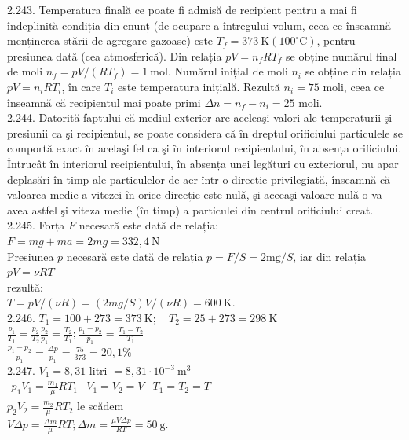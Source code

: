 2.243. Temperatura finală ce poate fi admisă de recipient pentru a mai fi îndeplinită condiția din enunț (de ocupare a întregului volum, ceea ce înseamnă menținerea stării de agregare gazoase) este $T_{f}=373 \mathrm{~K}\left(100^{\circ} \mathrm{C}\right)$, pentru presiunea dată (cea atmosferică). Din relația $p V=n_{f} R T_{f}$ se obține numărul final de moli $n_{f}=p V /\left(R T_{f}\right)=1 \mathrm{~mol}$. Numărul inițial de moli $n_{i}$ se obține din relația $p V=n_{i} R T_{i}$, în care $T_{i}$ este temperatura inițială. Rezultă $n_{i}=75$ moli, ceea ce înseamnă că recipientul mai poate primi $\Delta n=n_{f}-n_{i}=25$ moli.\\

2.244. Datorită faptului că mediul exterior are aceleaşi valori ale temperaturii şi presiunii ca şi recipientul, se poate considera că în dreptul orificiului particulele se comportă exact în acelaşi fel ca şi în interiorul recipientului, în absența orificiului. Întrucât în interiorul recipientului, în absența unei legături cu exteriorul, nu apar deplasări în timp ale particulelor de aer într-o direcție privilegiată, înseamnă că valoarea medie a vitezei în orice direcție este nulă, şi aceeaşi valoare nulă o va avea astfel şi viteza medie (în timp) a particulei din centrul orificiului creat.\\

2.245. Forța $F$ necesară este dată de relația:\\ $F=m g+m a=2 m g=332,4 \mathrm{~N}$\\ Presiunea $p$ necesară este dată de relația $p=F / S=2 \mathrm{mg} / S$, iar din relația\\ $p V=\nu R T$\\ rezultă:\\ $T=p V /(\nu R)=(2 m g / S) V /(\nu R)=600 \mathrm{~K}$.\\

2.246. $T_{1}=100+273=373 \mathrm{~K} ; \quad T_{2}=25+273=298 \mathrm{~K}$\\ $\frac{p_{1}}{T_{1}}=\frac{p_{2}}{T_{2}} \frac{p_{2}}{p_{1}}=\frac{T_{2}}{T_{1}} ; \frac{p_{1}-p_{2}}{p_{1}}=\frac{T_{1}-T_{2}}{T_{1}}$\\ $\frac{p_{1}-p_{2}}{p_{1}}=\frac{\Delta p}{p_{1}}=\frac{75}{373}=20,1 \%$\\

2.247. $V_{1}=8,31$ litri $=8,31 \cdot 10^{-3} \mathrm{~m}^{3}$\\ $\begin{array}{lrr} p_{1} V_{1}=\frac{m_{1}}{\mu} R T_{1} & V_{1}=V_{2}=V & T_{1}=T_{2}=T \end{array}$\\ $p_{2} V_{2}=\frac{m_{2}}{\mu} R T_{2}$ le scădem \\ $V \Delta p=\frac{\Delta m}{\mu} R T ; \Delta m=\frac{\mu V \Delta p}{R T}=50 \mathrm{~g}$.\\

